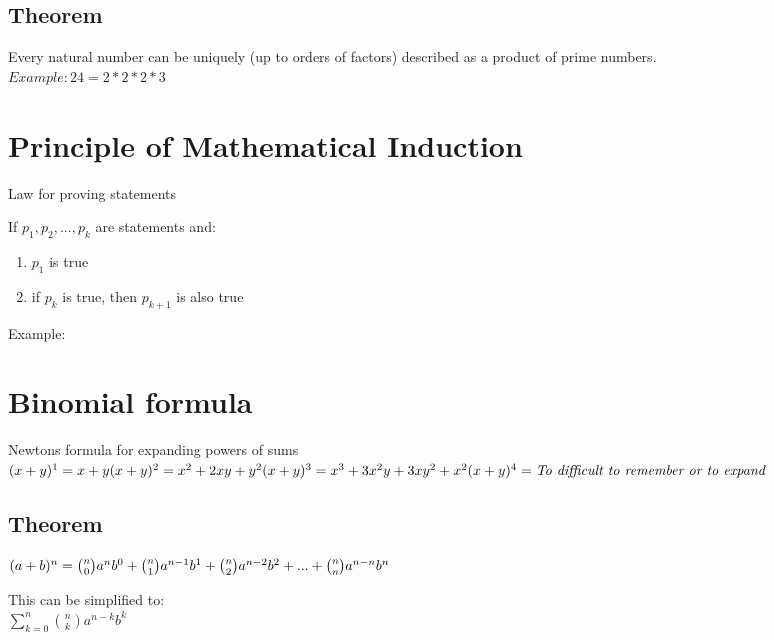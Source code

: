 \documentclass{report}
\begin{document}
	\subsection{Theorem}
	Every natural number can be uniquely (up to orders of factors) described as a product of prime numbers.\\
	$ Example: 24 = 2*2*2*3$

\section{Principle of Mathematical Induction}
Law for proving statements

If $ p_{1}, p_{2}, ..., p_{k} $ are statements and: 
	\begin{enumerate}
		\item $p_{1}$ is true
		\item if $p_{k}$ is true, then $p_{k + 1}$ is also true
	\end{enumerate}
Example: 

\section{Binomial formula}
Newtons formula for expanding powers of sums\\
$
(x+y)^1 = x + y \\
(x+y)^2 = x^2 + 2xy + y^2 \\ 
(x+y)^3 = x^3 + 3x^2y + 3xy^2 + x^2 \\
(x+y)^4 = \emph{To difficult to remember or to expand}
$

\subsection{Theorem}
$
(a + b)^n = \binom{n}{0}a^nb^0 + \binom{n}{1} a^{n-1}b^{1} + \binom{n}{2} a^{n-2}b^{2} + ... + \binom{n}{n} a^{n-n}b^{n}\\
$

This can be simplified to: \\
$
\sum\limits_{k=0}^n \binom{n}{k}a^{n-k}b^k
$
\end{document}

